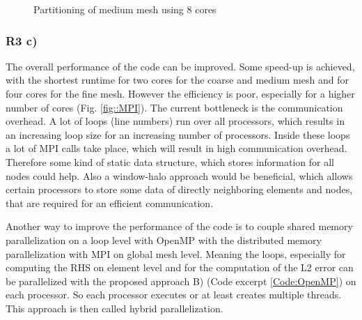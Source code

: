 \documentclass[a4paper, 11pt, oneside]{scrartcl}
\newcommand{\refFig}[1]{Fig. \ref{#1}}
\newcommand{\refCode}[1]{Code excerpt \ref{#1}}
\begin{document}
\begin{figure}[h!]
	\centering
	\caption{\label{fig::partition} Partitioning of medium mesh using 8 cores}
\end{figure}

\subsubsection{R3 c)}

The overall performance of the code can be improved. Some speed-up is achieved, with the shortest runtime for two cores for the coarse and medium mesh and for four cores for the fine mesh. However the efficiency is poor, especially for a higher number of cores (\refFig{fig::MPI}). The current bottleneck is the communication overhead. A lot of loops (line numbers) run over all processors, which results in an increasing loop size for an increasing number of processors. Inside these loops a lot of MPI calls take place, which will result in high communication overhead. Therefore some kind of static data structure, which stores information for all nodes could help. Also a window-halo approach would be beneficial, which allows certain processors to store some data of directly neighboring elements and nodes, that are required for an efficient communication.

Another way to improve the performance of the code is to couple shared memory parallelization on a loop level with OpenMP with the distributed memory parallelization with MPI on global mesh level. Meaning the loops, especially for computing the RHS on element level and for the computation of the L2 error can be parallelized with the proposed approach B) (\refCode{Code:OpenMP}) on each processor. So each processor executes or at least creates multiple threads. This approach is then called hybrid parallelization.
\end{document}
